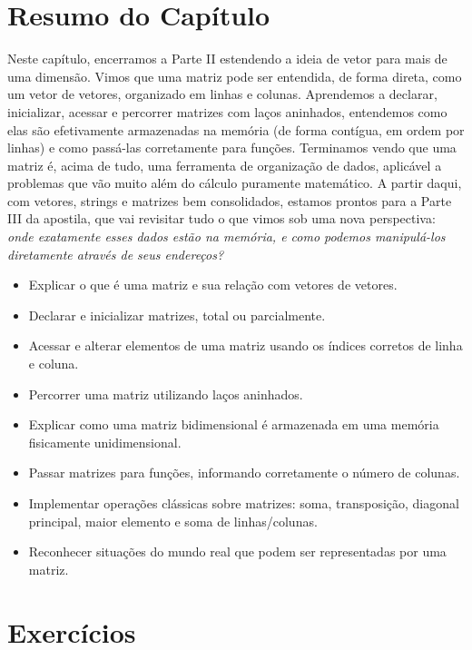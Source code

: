 \documentclass[12pt,a4paper,oneside]{extreport}
\begin{document}
\section*{Resumo do Capítulo}
Neste capítulo, encerramos a Parte II estendendo a ideia de vetor para mais de uma dimensão. Vimos que uma matriz pode ser entendida, de forma direta, como um vetor de vetores, organizado em linhas e colunas. Aprendemos a declarar, inicializar, acessar e percorrer matrizes com laços aninhados, entendemos como elas são efetivamente armazenadas na memória (de forma contígua, em ordem por linhas) e como passá-las corretamente para funções. Terminamos vendo que uma matriz é, acima de tudo, uma ferramenta de organização de dados, aplicável a problemas que vão muito além do cálculo puramente matemático. A partir daqui, com vetores, strings e matrizes bem consolidados, estamos prontos para a Parte III da apostila, que vai revisitar tudo o que vimos sob uma nova perspectiva: \textit{onde exatamente esses dados estão na memória, e como podemos manipulá-los diretamente através de seus endereços?}

\begin{tcolorbox}[title={Ao final deste capítulo, você deve ser capaz de:}]
\begin{itemize}
    \item Explicar o que é uma matriz e sua relação com vetores de vetores.
    \item Declarar e inicializar matrizes, total ou parcialmente.
    \item Acessar e alterar elementos de uma matriz usando os índices corretos de linha e coluna.
    \item Percorrer uma matriz utilizando laços aninhados.
    \item Explicar como uma matriz bidimensional é armazenada em uma memória fisicamente unidimensional.
    \item Passar matrizes para funções, informando corretamente o número de colunas.
    \item Implementar operações clássicas sobre matrizes: soma, transposição, diagonal principal, maior elemento e soma de linhas/colunas.
    \item Reconhecer situações do mundo real que podem ser representadas por uma matriz.
\end{itemize}
\end{tcolorbox}

\section*{Exercícios}
\end{document}
